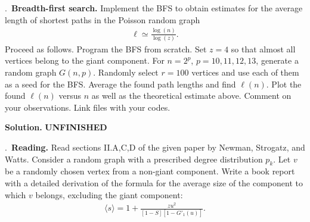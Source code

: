 \documentclass{letter}
\newcounter{problem}
\newcommand{\Problem}[2]{%
	\stepcounter{problem}%
	\leftskip=0pt%
	\theproblem.~\textbf{{#1.}} #2 \par%
}
\newcommand{\Solution}[1]{%
	\textbf{Solution.} #1 \par%
}
\newcommand{\UNFINISHED}{\textbf{\color{red} UNFINISHED}}
\begin{document}
    \Problem{Breadth-first search}{Implement the BFS to obtain estimates for the average length of shortest paths in the Poisson random graph \begin{align*}
        \ell \simeq \frac{\log(n)}{\log(z)}.
    \end{align*} Proceed as follows. Program the BFS from scratch. Set $z = 4$ so that almost all vertices belong to the giant component. For $n = 2^p$, $p = 10, 11, 12, 13$, generate a random graph $G(n,p)$. Randomly select $r = 100$ vertices and use each of them as a seed for the BFS. Average the found path lengths and find $\ell(n)$. Plot the found $\ell(n)$ versus $n$ as well as the theoretical estimate above. Comment on your observations. Link files with your codes.}
    \Solution{\UNFINISHED}

    \Problem{Reading}{Read sections II.A,C,D of the given paper by Newman, Strogatz, and Watts. Consider a random graph with a prescribed degree distribution $p_k$. Let $v$ be a randomly chosen vertex from a non-giant component. Write a book report with a detailed derivation of the formula for the average size of the component to which $v$ belongs, excluding the giant component: \begin{align*}
        \langle s \rangle = 1 + \frac{zu^2}{[1-S][1-G'_1(u)]}.
    \end{align*}}
\end{document}
